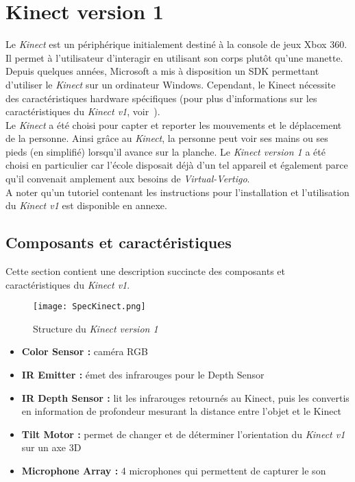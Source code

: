  
\pagebreak 
\section{Kinect version 1}  \label{kinect}
Le \textit{Kinect} est un périphérique initialement destiné à la \textsf{console de jeux Xbox 360}. Il permet à l'utilisateur d'interagir en utilisant son corps plutôt qu'une manette. Depuis quelques années, Microsoft a mis à disposition un SDK permettant d'utiliser le \textit{Kinect} sur un ordinateur Windows. Cependant, le Kinect nécessite des caractéristiques hardware spécifiques (pour plus d'informations sur les caractéristiques du\textit{ Kinect v1}, voir~\cite{PrerequisKinectv1}).\\

Le \textit{Kinect} a été choisi pour capter et reporter les mouvements et le déplacement de la personne. Ainsi grâce au \textit{Kinect}, la personne peut voir ses mains ou ses pieds (en simplifié) lorsqu'il avance sur la planche. Le \textit{Kinect version 1} a été choisi en particulier car l'école disposait déjà d'un tel appareil et également parce qu'il convenait amplement aux besoins de \textit{Virtual-Vertigo}.\\

A noter qu'un tutoriel contenant les instructions pour l'installation et l'utilisation du \textit{Kinect v1} est disponible en annexe.

\subsection{Composants et caractéristiques}  \label{composant}
Cette section contient une description succincte des composants et caractéristiques du \textit{Kinect v1}.
\begin{figure}[h]
	\centering
		\texttt{[image: SpecKinect.png]}
	\caption{\label{SpecKinect} Structure du \textit{Kinect version 1}}
\end{figure}

\begin{itemize}
	\item \textbf{Color Sensor : } caméra RGB
	\item \textbf{IR Emitter : } émet des infrarouges pour le Depth Sensor
	\item \textbf{IR Depth Sensor : } lit les infrarouges retournés au Kinect, puis les convertis en information de 	profondeur mesurant la distance entre l'objet et le Kinect
	\item \textbf{Tilt Motor : } permet de changer et de déterminer l'orientation du \textit{Kinect v1} sur un axe 3D
	\item \textbf{Microphone Array : } 4 microphones qui permettent de capturer le son\\
\end{itemize}

